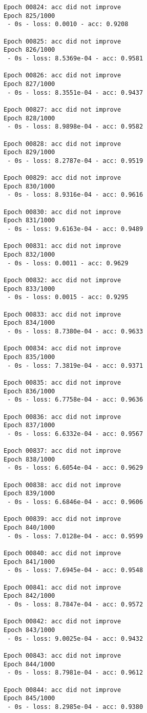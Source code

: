 \documentclass[11pt]{article}
\begin{document}
\begin{Verbatim}[commandchars=\\\{\}]
Epoch 00824: acc did not improve
Epoch 825/1000
 - 0s - loss: 0.0010 - acc: 0.9208

Epoch 00825: acc did not improve
Epoch 826/1000
 - 0s - loss: 8.5369e-04 - acc: 0.9581

Epoch 00826: acc did not improve
Epoch 827/1000
 - 0s - loss: 8.3551e-04 - acc: 0.9437

Epoch 00827: acc did not improve
Epoch 828/1000
 - 0s - loss: 8.9898e-04 - acc: 0.9582

Epoch 00828: acc did not improve
Epoch 829/1000
 - 0s - loss: 8.2787e-04 - acc: 0.9519

Epoch 00829: acc did not improve
Epoch 830/1000
 - 0s - loss: 8.9316e-04 - acc: 0.9616

Epoch 00830: acc did not improve
Epoch 831/1000
 - 0s - loss: 9.6163e-04 - acc: 0.9489

Epoch 00831: acc did not improve
Epoch 832/1000
 - 0s - loss: 0.0011 - acc: 0.9629

Epoch 00832: acc did not improve
Epoch 833/1000
 - 0s - loss: 0.0015 - acc: 0.9295

Epoch 00833: acc did not improve
Epoch 834/1000
 - 0s - loss: 8.7380e-04 - acc: 0.9633

Epoch 00834: acc did not improve
Epoch 835/1000
 - 0s - loss: 7.3819e-04 - acc: 0.9371

Epoch 00835: acc did not improve
Epoch 836/1000
 - 0s - loss: 6.7758e-04 - acc: 0.9636

Epoch 00836: acc did not improve
Epoch 837/1000
 - 0s - loss: 6.6332e-04 - acc: 0.9567

Epoch 00837: acc did not improve
Epoch 838/1000
 - 0s - loss: 6.6054e-04 - acc: 0.9629

Epoch 00838: acc did not improve
Epoch 839/1000
 - 0s - loss: 6.6846e-04 - acc: 0.9606

Epoch 00839: acc did not improve
Epoch 840/1000
 - 0s - loss: 7.0128e-04 - acc: 0.9599

Epoch 00840: acc did not improve
Epoch 841/1000
 - 0s - loss: 7.6945e-04 - acc: 0.9548

Epoch 00841: acc did not improve
Epoch 842/1000
 - 0s - loss: 8.7847e-04 - acc: 0.9572

Epoch 00842: acc did not improve
Epoch 843/1000
 - 0s - loss: 9.0025e-04 - acc: 0.9432

Epoch 00843: acc did not improve
Epoch 844/1000
 - 0s - loss: 8.7981e-04 - acc: 0.9612

Epoch 00844: acc did not improve
Epoch 845/1000
 - 0s - loss: 8.2985e-04 - acc: 0.9380


\end{Verbatim}
\end{document}
